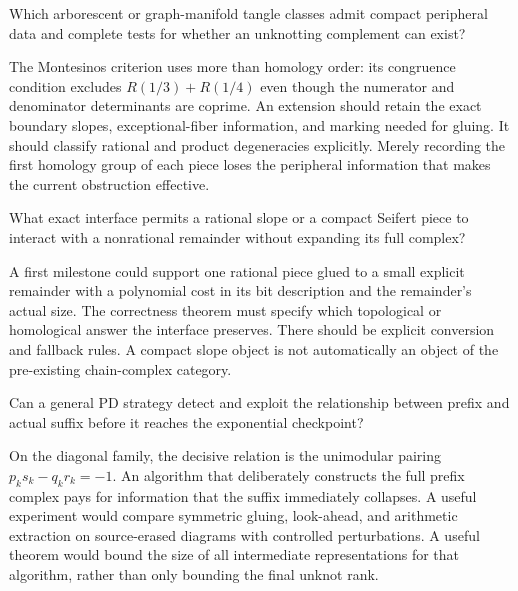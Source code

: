 \begin{researchquestion}
Which arborescent or graph-manifold tangle classes admit compact peripheral
data and complete tests for whether an unknotting complement can exist?
\end{researchquestion}
The Montesinos criterion uses more than homology order: its congruence
condition excludes \(R(1/3)+R(1/4)\) even though the numerator and denominator
determinants are coprime. An extension should retain the exact boundary
slopes, exceptional-fiber information, and marking needed for gluing.
It should classify rational and product degeneracies explicitly. Merely
recording the first homology group of each piece loses the peripheral
information that makes the current obstruction effective.

\begin{researchquestion}
What exact interface permits a rational slope or a compact Seifert piece
to interact with a nonrational remainder without expanding its full complex?
\end{researchquestion}
A first milestone could support one rational piece glued to a small explicit
remainder with a polynomial cost in its bit description and the remainder's
actual size. The correctness theorem must specify which topological or
homological answer the interface preserves. There should be explicit
conversion and fallback rules. A compact slope object is not automatically
an object of the pre-existing chain-complex category.

\begin{researchquestion}
Can a general PD strategy detect and exploit the relationship between
prefix and actual suffix before it reaches the exponential checkpoint?
\end{researchquestion}
On the diagonal family, the decisive relation is the unimodular pairing
\(p_ks_k-q_kr_k=-1\). An algorithm that deliberately constructs the
full prefix complex pays for information that the suffix immediately
collapses. A useful experiment would compare symmetric gluing,
look-ahead, and arithmetic extraction on source-erased diagrams with
controlled perturbations. A useful theorem would bound the size of all
intermediate representations for that algorithm, rather than only
bounding the final unknot rank.

